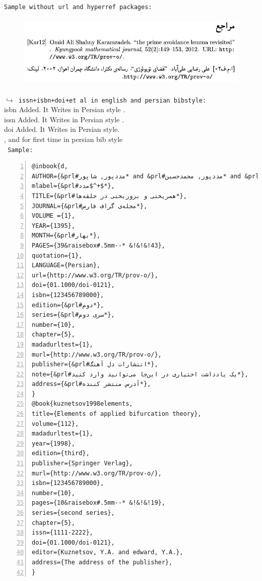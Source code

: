 \documentclass{article}
\begin{document}
\begin{latin}
{\tt {\color{blue}Sample without url and  hyperref packages:}}
\end{latin}\noindent
\begin{figure}[H]
\centering
\includegraphics[width=\textwidth,height=3.5cm]{image/sh5}
\end{figure}

\begin{latin}
{\tt{\color{red}$\hookrightarrow$ issn+isbn+doi+et~al in english and persian bibstyle:}}\\
{ isbn Added. It Writes in Persian style .\\
 issn Added. It Writes in Persian style .\\
doi Added. It Writes in Persian style.}\\
{,  and  for {\color{blue} first time} in persian bib style}\\
{\tt\color{blue} Sample:}
\begin{Verbatim}[numbers=left,fontsize=\bf,commandchars=\&\#\*,baselinestretch=1,firstnumber=1,formatcom=\color{green!50!black}]
@inbook{d,
AUTHOR={&prl#مددپور, شاپور* and &prl#مددپور, محمدحسین* and &prl#سایرین*},
mlabel={&prl#مدد$^+$*},
TITLE={&prl#همریختی و بروریختی در حلقه‌ها*},
JOURNAL={&prl#مجله‌ی گراف فارس*},
VOLUME ={1},
YEAR={1395},
MONTH={&prl#بهار*},
PAGES={39&raisebox#.5mm--* &!&!&!43},
quotation={1},
LANGUAGE={Persian},
url={http://www.w3.org/TR/prov-o/},
doi={01.1000/doi-0121},
isbn={123456789000},
edition={&prl#دوم*},
series={&prl#سری دوم*},
number={10},
chapter={5},
madadurltest={1},
murl={http://www.w3.org/TR/prov-o/},
publisher={&prl#انتشارات دل آهنگ*},
note={&prl#یک یادداشت اختیاری در این‌جا می‌توانید وارد کنید*},
address={&prl#آدرس منتشر کننده*},
}
@book{kuznetsov1998elements,
title={Elements of applied bifurcation theory},
volume={112},
madadurltest={1},
year={1998},
edition={third},
publisher={Springer Verlag},
murl={http://www.w3.org/TR/prov-o/},
isbn={123456789000},
number={10},
pages={10&raisebox#.5mm--* &!&!&!19},
series={second series},
chapter={5},
issn={1111-2222},
doi={01.1000/doi-0121},
editor={Kuznetsov, Y.A. and edward, Y.A.},
address={The address of the publisher},
}
\end{Verbatim}
\end{latin}
\end{document}

